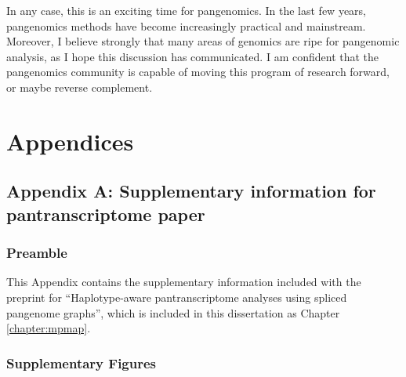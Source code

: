 \documentclass[11pt]{ucthesis}
\begin{document}
In any case, this is an exciting time for pangenomics. In the last few years, pangenomics methods have become increasingly practical and mainstream. Moreover, I believe strongly that many areas of genomics are ripe for pangenomic analysis, as I hope this discussion has communicated. I am confident that the pangenomics community is capable of moving this program of research forward, or maybe reverse complement.

\renewcommand{\figurename}{Supplementary Figure}
\renewcommand{\tablename}{Supplementary Table}

\appendix

\part{Appendices}

\chapter{Appendix A: Supplementary information for pantranscriptome paper}

\section{Preamble}

This Appendix contains the supplementary information included with the preprint for ``Haplotype-aware pantranscriptome analyses using spliced pangenome graphs'', which is included in this dissertation as Chapter \ref{chapter:mpmap}.

\section{Supplementary Figures}
\end{document}

